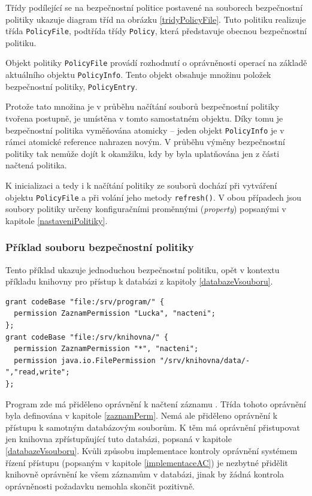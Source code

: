 Třídy podílející se na bezpečnostní politice postavené na souborech bezpečnostní politiky ukazuje diagram tříd na obrázku \ref{tridyPolicyFile}.
Tuto politiku realizuje třída {\tt PolicyFile}, podtřída třídy {\tt Policy}, která představuje obecnou bezpečnostní politiku.

Objekt politiky {\tt PolicyFile} provádí rozhodnutí o oprávněnosti operací na základě aktuálního objektu {\tt PolicyInfo}.
Tento objekt obsahuje množinu položek bezpečnostní politiky, {\tt PolicyEntry}.

Protože tato množina je v průběhu načítání souborů bezpečnostní politiky tvořena postupně, je umístěna v tomto samostatném objektu.
Díky tomu je bezpečnostní politika vyměňována atomicky -- jeden objekt {\tt PolicyInfo} je v rámci atomické reference nahrazen novým.
V průběhu výměny bezpečnostní politiky tak nemůže dojít k okamžiku, kdy by byla uplatňována jen z části načtená politika.

K inicializaci a tedy i k načítání politiky ze souborů dochází při vytváření objektu {\tt PolicyFile} a při volání jeho metody {\tt refresh()}.
V obou případech jsou soubory politiky určeny konfiguračními proměnnými ({\it property}) popsanými v kapitole \ref{nastaveniPolitiky}.

\subsubsection{Příklad souboru bezpečnostní politiky}

Tento příklad ukazuje jednoduchou bezpečnostní politiku, opět v kontextu příkladu knihovny pro přístup k databázi z kapitoly \ref{databazeVsouboru}.

\begin{lstlisting}[caption=Příklad souboru bezpečnostní politiky, label=prikladSouboruBP]
grant codeBase "file:/srv/program/" {
  permission ZaznamPermission "Lucka", "nacteni";
};
grant codeBase "file:/srv/knihovna/" {
  permission ZaznamPermission "*", "nacteni";
  permission java.io.FilePermission "/srv/knihovna/data/-","read,write";
};
\end{lstlisting}

Program zde má přiděleno oprávnění k načtení záznamu . Třída tohoto oprávnění byla definována v kapitole \ref{zaznamPerm}.
Nemá ale přiděleno oprávnění k přístupu k samotným databázovým souborům.
K těm má oprávnění přistupovat jen knihovna zpřístupňující tuto databázi, popsaná v kapitole \ref{databazeVsouboru}.
Kvůli způsobu implementace kontroly oprávnění systémem řízení přístupu (popsaným v kapitole \ref{implementaceAC}) je nezbytné přidělit knihovně oprávnění ke všem záznamům v databázi, jinak by žádná kontrola oprávněnosti požadavku nemohla skončit pozitivně.

